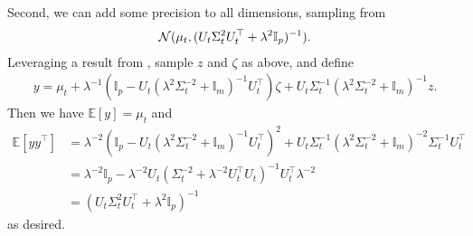 Second, we can add some precision to all dimensions, sampling from
\begin{align}
    \mathcal{N}(\mu_t,(U_t\Sigma_t^2U_t^{\top} + \lambda^2\mathbb{I}_p)^{-1}).
\end{align}
Leveraging a result from \citep{LRVGA}, sample $z$ and $\zeta$ as above, and define
\begin{align}
    y = \mu_t + \lambda^{-1}\left(\mathbb{I}_p - U_t\left(\lambda^2\Sigma_t^{-2}+\mathbb{I}_m\right)^{-1}U_t^{\top}\right)\zeta + U_t\Sigma_t^{-1}\left(\lambda^2\Sigma_t^{-2}+\mathbb{I}_m\right)^{-1}z.
    \label{eq:ORFit-PPD-sample-b}
\end{align}
Then we have $\mathbb{E}[y]=\mu_t$ and
\begin{align}
    \mathbb{E}[yy^{\top}] &= \lambda^{-2}\left(\mathbb{I}_p - U_t\left(\lambda^2\Sigma_t^{-2}+\mathbb{I}_m\right)^{-1}U_t^{\top}\right)^2 + U_t\Sigma_t^{-1}\left(\lambda^2\Sigma_t^{-2}+\mathbb{I}_m\right)^{-2}\Sigma_t^{-1}U_t^{\top} \\
    &= \lambda^{-2}\mathbb{I}_p - \lambda^{-2}U_t\left(\Sigma_t^{-2}+\lambda^{-2}U_t^{\top}U_t\right)^{-1}U_t^{\top}\lambda^{-2} \\
    &= \left( U_t\Sigma_t^2U_t^{\top} + \lambda^2\mathbb{I}_p \right)^{-1}
\end{align}
as desired.

